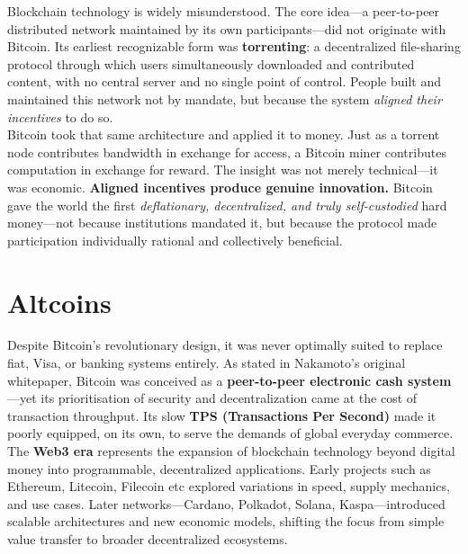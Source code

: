 \documentclass[12pt, a4paper, oneside]{report}
\theoremstyle{definition}
\begin{document}
Blockchain technology is widely misunderstood. The core idea—a peer-to-peer 
distributed network maintained by its own participants—did not originate with Bitcoin. 
Its earliest recognizable form was \textbf{torrenting}: a decentralized file-sharing 
protocol through which users simultaneously downloaded and contributed content, with 
no central server and no single point of control. People built and maintained this 
network not by mandate, but because the system \emph{aligned their incentives} to 
do so.\\[0.4cm]

Bitcoin took that same architecture and applied it to money. Just as a torrent node 
contributes bandwidth in exchange for access, a Bitcoin miner contributes computation 
in exchange for reward. The insight was not merely technical—it was economic. 
\textbf{Aligned incentives produce genuine innovation.} Bitcoin gave the world the 
first \emph{deflationary, decentralized, and truly self-custodied} hard money—not 
because institutions mandated it, but because the protocol made participation 
individually rational and collectively beneficial.





\section{Altcoins}
\label{chap:Altcoins}

Despite Bitcoin's revolutionary design, it was never optimally suited to replace 
fiat, Visa, or banking systems entirely. As stated in Nakamoto's original whitepaper, 
Bitcoin was conceived as a \textbf{peer-to-peer electronic cash system}—yet its 
prioritisation of security and decentralization came at the cost of transaction 
throughput. Its slow \textbf{TPS (Transactions Per Second)} made it poorly equipped, 
on its own, to serve the demands of global everyday commerce.\\[0.4cm]

The \textbf{Web3 era} represents the expansion of blockchain technology beyond digital 
money into programmable, decentralized applications. Early projects such as 
 Ethereum, Litecoin, Filecoin etc explored variations in speed, supply mechanics, and use 
cases. Later networks—Cardano, Polkadot, Solana, Kaspa—introduced scalable architectures 
and new economic models, shifting the focus from simple value transfer to broader 
decentralized ecosystems.\\[0.4cm]
\end{document}
